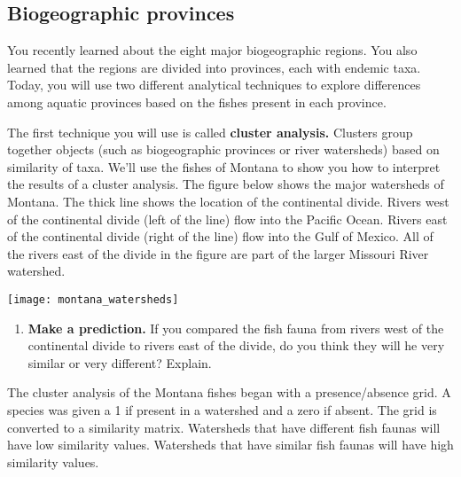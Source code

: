 \documentclass[11pt]{article}
\begin{document}
\thispagestyle{first_page}
\fontsize{14pt}{16pt}\selectfont

\subsection*{Biogeographic provinces}

You recently learned about the eight major biogeographic regions. 
You also learned that the regions are divided into provinces, each with
endemic taxa.  Today, you will use two different analytical techniques to explore 
differences among aquatic provinces based on the fishes present in each 
province.

The first technique you will use is called \textbf{cluster analysis.} Clusters
group together objects (such as biogeographic provinces or river watersheds)
based on similarity of taxa. We'll use the fishes of Montana to show you
how to interpret the results of a cluster analysis.  The figure below shows the
major watersheds of Montana.  The thick line shows the location of the
continental divide. Rivers west of the continental divide (left of the line)
flow into the Pacific Ocean. Rivers east of the continental divide (right
of the line) flow into the Gulf of Mexico.  All of the rivers east of the divide
in the figure are part of the larger Missouri River watershed.

\begin{center}
	\texttt{[image: montana\_watersheds]}
\end{center}

\begin{enumerate}[leftmargin=*]
\item \textbf{Make a prediction.} If you compared the fish fauna from 
rivers west of the continental divide  to rivers east of the divide, do you think
they will he very similar or very different? Explain.%
\end{enumerate}


\newpage

The cluster analysis of the Montana fishes began with a presence/absence
grid. A species was given a 1 if present in a watershed and a zero if absent. 
The grid is converted to a similarity matrix. Watersheds that have different
fish faunas will have low similarity values. Watersheds that have similar fish 
faunas will have high similarity values.  
\end{document}
